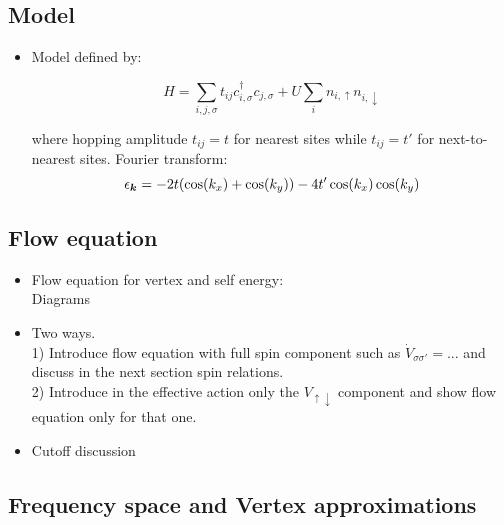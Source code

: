 \subsection{Model}

\begin{itemize}

\item Model defined by:

\begin{equation}
H = \sum_{i,j,\sigma} t_{ij} c^{\dagger}_{i,\sigma} c_{j,\sigma} + U \sum_{i} n_{i,\uparrow} n_{i,\downarrow}
\end{equation}

where hopping amplitude $t_{ij} = t$ for nearest sites while $t_{ij}=t'$ for next-to-nearest sites. 
Fourier transform:
\begin{equation}
\epsilon_{\boldsymbol{k}} = -2t(\cos(k_x)+\cos(k_y)) - 4t' \cos(k_x) \cos(k_y)
\end{equation}

\end{itemize}

\subsection{Flow equation}

\begin{itemize}

\item
Flow equation for vertex and self energy:
\\
Diagrams
\\

\item Two ways. 
\\
1) Introduce flow equation with full spin component such as $\dot{V}_{\sigma \sigma'} = ...$ and discuss in the next section spin relations.
\\
2) Introduce in the effective action only the $V_{\uparrow \downarrow}$ component and show flow equation 
only for that one.

\item Cutoff discussion

\end{itemize}

\subsection{Frequency space and Vertex approximations}

